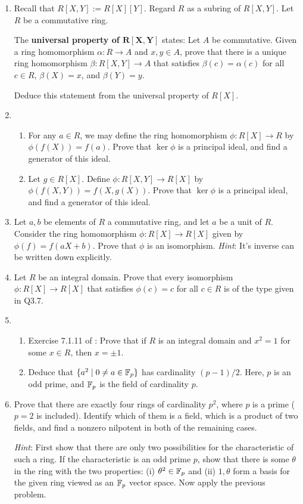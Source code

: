 \documentclass[../psets.tex]{subfiles}
\begin{document}
\begin{enumerate}
    \item Recall that $R[X,Y]:=R[X][Y]$. Regard $R$ as a subring of $R[X,Y]$. Let $R$ be a commutative ring.\par
    The \textbf{universal property of $\bm{R[X,Y]}$} states: Let $A$ be commutative. Given a ring homomorphism $\alpha:R\to A$ and $x,y\in A$, prove that there is a unique ring homomorphism $\beta:R[X,Y]\to A$ that satisfies $\beta(c)=\alpha(c)$ for all $c\in R$, $\beta(X)=x$, and $\beta(Y)=y$.\par
    Deduce this statement from the universal property of $R[X]$.
    \item 
    \begin{enumerate}[label={(\roman*)}]
        \item For any $a\in R$, we may define the ring homomorphism $\phi:R[X]\to R$ by $\phi(f(X))=f(a)$. Prove that $\ker\phi$ is a principal ideal, and find a generator of this ideal.
        \item Let $g\in R[X]$. Define $\phi:R[X,Y]\to R[X]$ by $\phi(f(X,Y))=f(X,g(X))$. Prove that $\ker\phi$ is a principal ideal, and find a generator of this ideal.
    \end{enumerate}
    \item Let $a,b$ be elements of $R$ a commutative ring, and let $a$ be a unit of $R$. Consider the ring homomorphism $\phi:R[X]\to R[X]$ given by $\phi(f)=f(aX+b)$. Prove that $\phi$ is an isomorphism. \emph{Hint}: It's inverse can be written down explicitly.
    \item Let $R$ be an integral domain. Prove that every isomorphism $\phi:R[X]\to R[X]$ that satisfies $\phi(c)=c$ for all $c\in R$ is of the type given in Q3.7.
    \item 
    \begin{enumerate}[label={(\roman*)}]
        \item Exercise 7.1.11 of \textcite{bib:DummitFoote}: Prove that if $R$ is an integral domain and $x^2=1$ for some $x\in R$, then $x=\pm 1$.
        \item Deduce that $\{a^2\mid 0\neq a\in\mathbb{F}_p\}$ has cardinality $(p-1)/2$. Here, $p$ is an odd prime, and $\mathbb{F}_p$ is the field of cardinality $p$.
    \end{enumerate}
    \item Prove that there are exactly four rings of cardinality $p^2$, where $p$ is a prime ($p=2$ is included). Identify which of them is a field, which is a product of two fields, and find a nonzero nilpotent in both of the remaining cases.\par
    \emph{Hint}: First show that there are only two possibilities for the characteristic of such a ring. If the characteristic is an odd prime $p$, show that there is some $\theta$ in the ring with the two properties: (i) $\theta^2\in\mathbb{F}_p$ and (ii) $1,\theta$ form a basis for the given ring viewed as an $\mathbb{F}_p$ vector space. Now apply the previous problem.
\end{enumerate}
\end{document}
